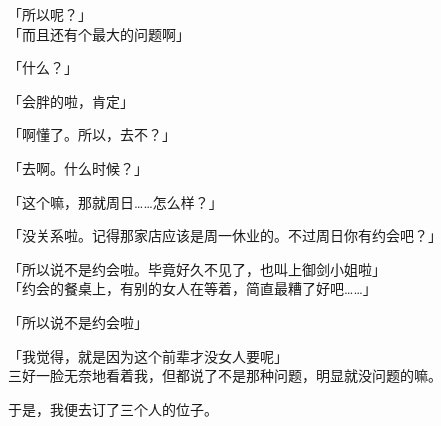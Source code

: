 「所以呢？」\\

「而且还有个最大的问题啊」

「什么？」

「会胖的啦，肯定」

「啊懂了。所以，去不？」

「去啊。什么时候？」

「这个嘛，那就周日……怎么样？」

「没关系啦。记得那家店应该是周一休业的。不过周日你有约会吧？」

「所以说不是约会啦。毕竟好久不见了，也叫上御剑小姐啦」\\

「约会的餐桌上，有别的女人在等着，简直最糟了好吧……」

「所以说不是约会啦」

「我觉得，就是因为这个前辈才没女人要呢」\\

三好一脸无奈地看着我，但都说了不是那种问题，明显就没问题的嘛。

于是，我便去订了三个人的位子。\\
